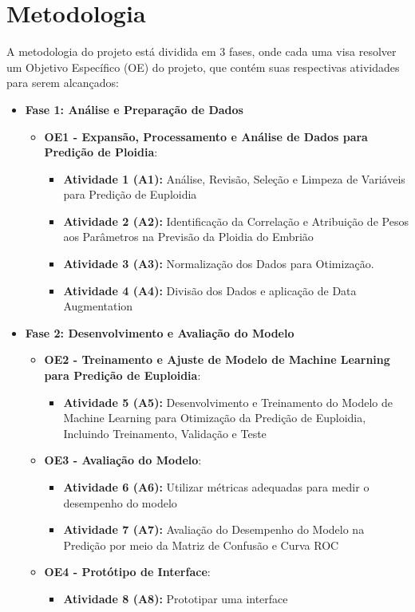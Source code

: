 \section{Metodologia}
A metodologia do projeto está dividida em 3 fases, onde cada uma visa resolver um Objetivo Específico (OE) do projeto, que contém suas respectivas atividades para serem alcançados:

\begin{itemize}
    \item \textbf{Fase 1: Análise e Preparação de Dados}
    \begin{itemize}
        \item \textbf{OE1 - Expansão, Processamento e Análise de Dados para Predição de Ploidia}: 
        \begin{itemize}
            \item \textbf{Atividade 1 (A1):} Análise, Revisão, Seleção e Limpeza de Variáveis para Predição de Euploidia 
            \item \textbf{Atividade 2 (A2):} Identificação da Correlação e Atribuição de Pesos aos Parâmetros na Previsão da Ploidia do Embrião
            \item \textbf{Atividade 3 (A3):} Normalização dos Dados para Otimização.
            \item \textbf{Atividade 4 (A4):} Divisão dos Dados e aplicação de Data Augmentation
        \end{itemize}
    \end{itemize}

    \item \textbf{Fase 2: Desenvolvimento e Avaliação do Modelo}
    \begin{itemize}
        \item \textbf{OE2 - Treinamento e Ajuste de Modelo de Machine Learning para Predição de Euploidia}: 
        \begin{itemize}
            \item \textbf{Atividade 5 (A5):} Desenvolvimento e Treinamento do Modelo de Machine Learning para Otimização da Predição de Euploidia, Incluindo Treinamento, Validação e Teste
        \end{itemize}

        \item \textbf{OE3 - Avaliação do Modelo}: 
        \begin{itemize}
            \item \textbf{Atividade 6 (A6):} Utilizar métricas adequadas para medir o desempenho do modelo
            \item \textbf{Atividade 7 (A7):} Avaliação do Desempenho do Modelo na Predição por meio da Matriz de Confusão e Curva ROC
        \end{itemize}

        \item \textbf{OE4 - Protótipo de Interface}: 
        \begin{itemize}
            \item \textbf{Atividade 8 (A8):} Prototipar uma interface
        \end{itemize}
    \end{itemize}
\end{itemize}


